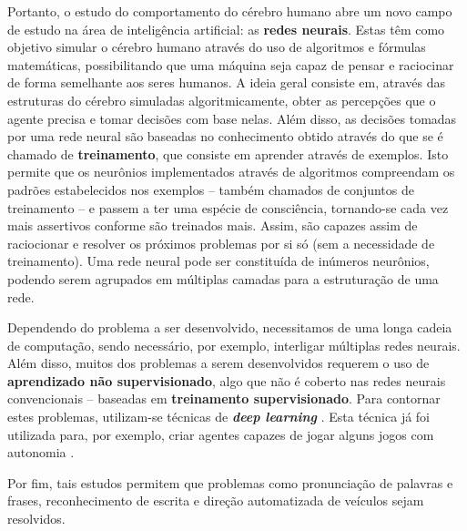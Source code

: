 Portanto, o estudo do comportamento do cérebro humano abre um novo campo de
estudo na área de inteligência artificial: as \textbf{redes neurais}. Estas têm
como objetivo simular o cérebro humano através do uso de algoritmos e fórmulas
matemáticas, possibilitando que uma máquina seja capaz de pensar e raciocinar de
forma semelhante aos seres humanos. A ideia geral consiste em, através das
estruturas do cérebro simuladas algoritmicamente, obter as percepções que o
agente precisa e tomar decisões com base nelas. Além disso, as decisões tomadas
por uma rede neural são baseadas no conhecimento obtido através do que se é
chamado de \textbf{treinamento}, que consiste em aprender através de exemplos.
Isto permite que os neurônios implementados através de algoritmos compreendam os
padrões estabelecidos nos exemplos -- também chamados de conjuntos de
treinamento -- e passem a ter uma espécie de consciência, tornando-se cada vez
mais assertivos conforme são treinados mais. Assim, são capazes assim de
raciocionar e resolver os próximos problemas por si só (sem a necessidade de
treinamento). Uma rede neural pode ser constituída de inúmeros neurônios,
podendo serem agrupados em múltiplas camadas para a estruturação de uma rede.

Dependendo do problema a ser desenvolvido, necessitamos de uma longa cadeia de
computação, sendo necessário, por exemplo, interligar múltiplas redes neurais.
Além disso, muitos dos problemas a serem desenvolvidos requerem o uso de
\textbf{ aprendizado não supervisionado}, algo que não é coberto nas redes
neurais convencionais -- baseadas em \textbf{treinamento supervisionado}. Para
contornar estes problemas, utilizam-se técnicas de \textbf{\textit{deep
learning}} \cite{DBLP:journals/corr/Schmidhuber14}. Esta técnica já foi
utilizada para, por exemplo, criar agentes capazes de jogar alguns jogos com
autonomia \cite{mnih-atari-2013}.

Por fim, tais estudos permitem que problemas como pronunciação de palavras e
frases, reconhecimento de escrita e direção automatizada de veículos
\cite{Russell:1995:AIM:193191} sejam resolvidos.
